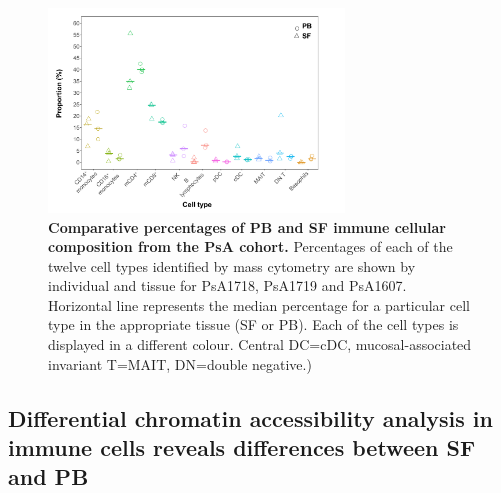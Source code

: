 \begin{figure}[H]
\centering
\includegraphics[width=0.7\textwidth]{./Results3/pdfs/PSA_ATAC_cohort_cell_type_composition_boxplots}
\caption[Comparative percentages of PB and SF immune cellular composition from the PsA cohort.]{\textbf{Comparative percentages of PB and SF immune cellular composition from the PsA cohort.} Percentages of each of the twelve cell types identified by mass cytometry are shown by individual and tissue for PsA1718, PsA1719 and PsA1607. Horizontal line represents the median percentage for a particular cell type in the appropriate tissue (SF or PB). Each of the cell types is displayed in a different colour. Central DC=cDC, mucosal-associated invariant T=MAIT, DN=double negative.)}
\label{figure:PsA_cell_composition}
\end{figure}



\subsection{Differential chromatin accessibility analysis in immune cells reveals differences between SF and PB}

